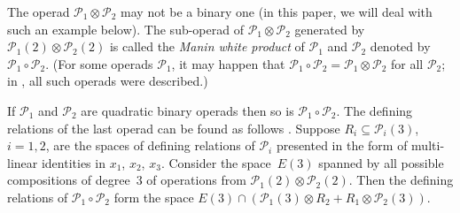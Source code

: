 \documentclass[pdftex]{sigma}
\numberwithin{equation}{section}
\begin{document}
The operad $\mathcal P_1\otimes \mathcal P_2$ may not be a binary one (in this paper, we will deal
with such an example below). The sub-operad of $\mathcal P_1\otimes \mathcal P_2$ generated
by $\mathcal P_1(2)\otimes \mathcal P_2(2)$ is
called the {\em Manin white product} of $\mathcal P_1$ and $\mathcal P_2$ denoted by
$\mathcal P_1\circ\mathcal P_2$.
(For some operads $\mathcal P_1$, it may happen that
$\mathcal P_1\circ \mathcal P_2 = \mathcal P_1\otimes \mathcal P_2$
for all $\mathcal P_2$; in \cite{Vallette2008}, all such operads were described.)

If $\mathcal P_1$ and $\mathcal P_2$ are quadratic binary operads then so is
$\mathcal P_1\circ \mathcal P_2$. The defining relations of the last operad can be found
as follows \cite{GK-1994}. Suppose $R_i\subseteq \mathcal P_i(3)$,
$i=1,2$, are the spaces of defining relations of
$\mathcal P_i$ presented in the form of multi-linear identities in $x_1$, $x_2$, $x_3$.
Consider the space~$E(3)$ spanned by all possible compositions of degree~3 of operations from
$\mathcal P_1(2)\otimes \mathcal P_2(2)$.
Then the defining relations of $\mathcal P_1\circ \mathcal P_2$
form the space $E(3)\cap (\mathcal P_1(3)\otimes R_2 + R_1\otimes \mathcal P_2(3))$.
\end{document}
